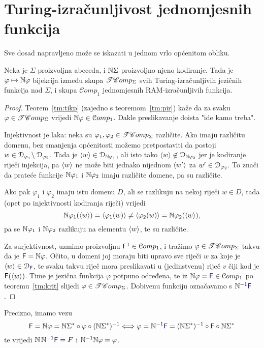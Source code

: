 \section{Turing-izračunljivost jednomjesnih funkcija}

Sve dosad napravljeno može se iskazati u jednom vrlo općenitom obliku.

\begin{propozicija}\label{pp:trackbij}
Neka je $\Sigma$ proizvoljna abeceda, i ${\mathbb N}\Sigma$ proizvoljno njeno kodiranje. Tada je $\varphi\mapsto{\mathbb N}\varphi$ bijekcija između skupa $\mathscr{TC}omp_\Sigma$ svih Turing-izračunljivih jezičnih funkcija nad $\Sigma$, i skupa $\mathcal Comp_1$ jednomjesnih RAM-izračunljivih funkcija.
\end{propozicija}

\begin{proof}
Teorem~\ref{tm:tikp} (zajedno s teoremom~\ref{tm:pir}) kaže da za svaku $\varphi\in\mathscr{TC}omp_\Sigma$ vrijedi ${\mathbb N}\varphi\in\mathcal Comp_1$. Dakle preslikavanje doista "ide kamo treba".

Injektivnost je laka: neka su $\varphi_1,\varphi_2\in\mathscr{TC}omp_\Sigma$ različite. Ako imaju različitu domenu, bez smanjenja općenitosti možemo pretpostaviti da postoji $w\in\mathcal D_{\varphi_1}\!\setminus\mathcal D_{\varphi_2}$. Tada je $\langle w\rangle\in\mathcal D_{{\mathbb N}\varphi_1}$, ali isto tako $\langle w\rangle\not\in\mathcal D_{{\mathbb N}\varphi_2}$ jer je kodiranje riječi injekcija, pa $\langle w\rangle$ ne može biti jednako nijednom $\langle w'\rangle$ za $w'\in\mathcal D_{\varphi_2}$. To znači da prateće funkcije ${\mathbb N}\varphi_1$ i ${\mathbb N}\varphi_2$ imaju različite domene, pa su različite.

Ako pak $\varphi_1$ i $\varphi_2$ imaju istu domenu $D$, ali se razlikuju na nekoj riječi $w\in D$, tada (opet po injektivnosti kodiranja riječi) vrijedi
\begin{equation}
    {\mathbb N}\varphi_1(\langle w\rangle)=\langle\varphi_1(w)\rangle\not=\langle\varphi_2(w)\rangle={\mathbb N}\varphi_2(\langle w\rangle)\text,
\end{equation}
pa se ${\mathbb N}\varphi_1$ i ${\mathbb N}\varphi_2$ razlikuju na elementu $\langle w\rangle$, te su različite.

Za surjektivnost, uzmimo proizvoljnu $\f F^1\in\mathcal Comp_1$, i tražimo $\varphi\in\mathscr{TC}omp_\Sigma$ takvu da je $\f F=\N\varphi$. Očito, u domeni joj moraju biti upravo sve riječi $w$ za koje je $\kr w\in\dom{\f F}$, te svaku takvu riječ mora preslikavati u (jedinstvenu) riječ $v$ čiji kod je $\f F(\kr w)$. Time je jezična funkcija $\varphi$ potpuno određena, te iz $\N\varphi=\f F\in\mathcal Comp_1$ po teoremu~\ref{tm:krit} slijedi $\varphi\in\mathscr{TC}omp_\Sigma$. Dobivenu funkciju označavamo s $\N^{-1}\f F$.
\end{proof}
Precizno, imamo vezu
\begin{equation}
\f F=\N\varphi=\N\Sigma^*\circ\varphi\circ(\N\Sigma^*)^{-1}\Longleftrightarrow
\varphi=\N^{-1}\f F=(\N\Sigma^*)^{-1}\circ\f F\circ\N\Sigma^*
\end{equation}
te vrijedi $\N\,\N^{-1}\f F=F$ i ${\mathbb N}^{-1}{\mathbb N}\varphi=\varphi$.

